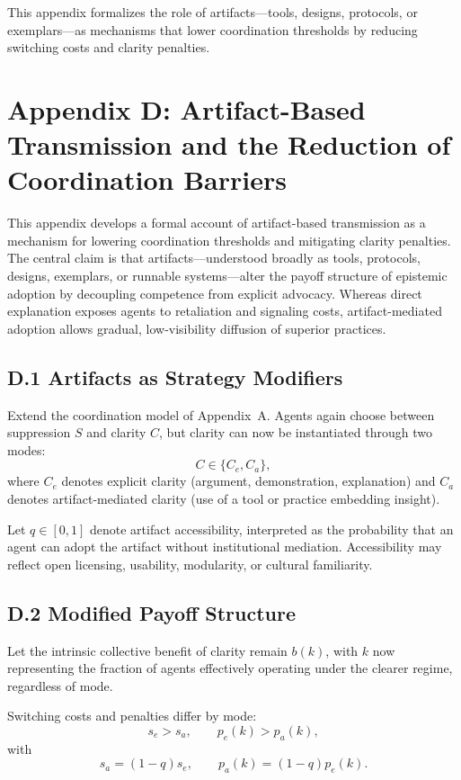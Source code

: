 \documentclass[11pt]{article}
\begin{document}
This appendix formalizes the role of artifacts—tools, designs, protocols, or exemplars—as mechanisms that lower coordination thresholds by reducing switching costs and clarity penalties.

\section{Appendix D: Artifact-Based Transmission and the Reduction of Coordination Barriers}
\label{app:artifact-detailed}

This appendix develops a formal account of artifact-based transmission as a mechanism for lowering coordination thresholds and mitigating clarity penalties. The central claim is that artifacts—understood broadly as tools, protocols, designs, exemplars, or runnable systems—alter the payoff structure of epistemic adoption by decoupling competence from explicit advocacy. Whereas direct explanation exposes agents to retaliation and signaling costs, artifact-mediated adoption allows gradual, low-visibility diffusion of superior practices.

\subsection{D.1 Artifacts as Strategy Modifiers}

Extend the coordination model of Appendix~A. Agents again choose between suppression \(S\) and clarity \(C\), but clarity can now be instantiated through two modes:
\[
C \in \{C_e, C_a\},
\]
where \(C_e\) denotes explicit clarity (argument, demonstration, explanation) and \(C_a\) denotes artifact-mediated clarity (use of a tool or practice embedding insight).

Let \(q \in [0,1]\) denote artifact accessibility, interpreted as the probability that an agent can adopt the artifact without institutional mediation. Accessibility may reflect open licensing, usability, modularity, or cultural familiarity.

\subsection{D.2 Modified Payoff Structure}

Let the intrinsic collective benefit of clarity remain \(b(k)\), with \(k\) now representing the fraction of agents effectively operating under the clearer regime, regardless of mode.

Switching costs and penalties differ by mode:
\[
s_e > s_a, \qquad p_e(k) > p_a(k),
\]
with
\[
s_a = (1-q)s_e, \qquad p_a(k) = (1-q)p_e(k).
\]
\end{document}
